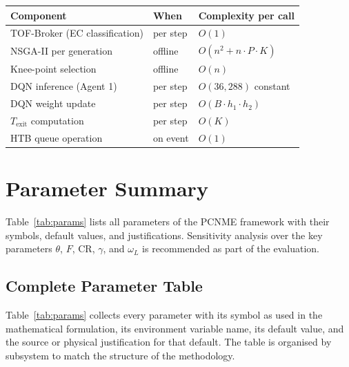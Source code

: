 \documentclass[12pt,a4paper]{article}
\theoremstyle{definition}
\theoremstyle{remark}
\begin{document}
\begin{center}
\renewcommand{\arraystretch}{1.3}
\begin{tabular}{@{}lll@{}}
\toprule
\textbf{Component} & \textbf{When} & \textbf{Complexity per call} \\
\midrule
TOF-Broker (EC classification) & per step & $O(1)$ \\
NSGA-II per generation         & offline  & $O(n^2 + n \cdot P \cdot K)$ \\
Knee-point selection           & offline  & $O(n)$ \\
DQN inference (Agent 1)        & per step & $O(36{,}288)$ constant \\
DQN weight update              & per step & $O(B \cdot h_1 \cdot h_2)$ \\
$T_{\text{exit}}$ computation  & per step & $O(K)$ \\
HTB queue operation            & on event & $O(1)$ \\
\bottomrule
\end{tabular}
\end{center}

\section{Parameter Summary}
\label{sec:params}

Table~\ref{tab:params} lists all parameters of the PCNME framework with their
symbols, default values, and justifications. Sensitivity analysis over the
key parameters $\theta$, $F$, $\mathrm{CR}$, $\gamma$, and $\omega_L$ is
recommended as part of the evaluation.

\subsection{Complete Parameter Table}

Table~\ref{tab:params} collects every parameter with its symbol as used in
the mathematical formulation, its environment variable name, its default
value, and the source or physical justification for that default. The table
is organised by subsystem to match the structure of the methodology.
\end{document}
